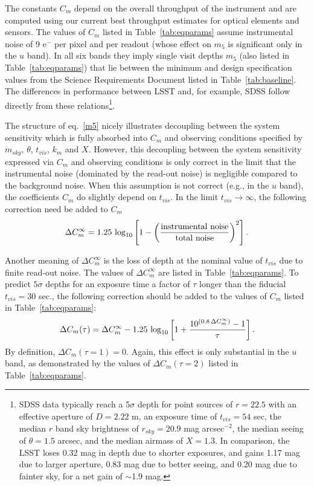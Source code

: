 The constants $C_m$ depend on the overall throughput of the instrument
and are computed using our current best throughput estimates for
optical elements and sensors. The values of $C_m$ listed in Table~\ref{tab:eqparams} 
assume instrumental noise of 9 e$^-$ per pixel and per readout (whose effect on $m_5$
is significant only in the $u$ band). In all six bands they imply single visit depths $m_5$ 
(also listed in Table~\ref{tab:eqparams}) that lie between the minimum and design
specification values from the Science Requirements
Document listed in Table~\ref{tab:baseline}.
The differences in performance between LSST and, for example, SDSS
follow directly from these relations\footnote{SDSS data
typically reach a 5$\sigma$ depth for point sources of $r=22.5$
with an effective aperture of $D=2.22$ m, an exposure time of $t_{vis}=54$
sec, the median $r$ band sky brightness of $r_{sky}=20.9$ mag arcsec$^{-2}$,
the median seeing of $\theta=1.5$ arcsec, and the median airmass of $X=1.3$.
In comparison, the LSST loses 0.32 mag in depth due to shorter exposures,
and gains 1.17 mag due to larger aperture, 0.83 mag due to better
seeing, and 0.20 mag due to fainter sky, for a net gain of $\sim$1.9 mag.}.

The structure of eq.~\ref{m5} nicely illustrates decoupling between the system
sensitivity which is fully absorbed into $C_m$ and observing conditions
specified by $m_{sky}$, $\theta$, $t_{vis}$, $k_m$
and $X$. However, this decoupling between the system sensitivity 
expressed via $C_m$ and observing conditions is only correct in the limit that the instrumental noise 
(dominated by the read-out noise) is negligible compared to the background noise. When this assumption 
is not correct (e.g., in the $u$ band), the coefficients $C_m$ do slightly depend on $t_{vis}$. In the limit 
$t_{vis} \rightarrow \infty$, the following correction need be added to $C_m$
\begin{equation}
\Delta C^\infty_m = 1.25 \,\log_{10}\left[1 - \left(\mathrm{instrumental \,\, noise} \over \mathrm{total \,\, noise}    \right)^2\right].
\end{equation}

Another meaning of $\Delta C^\infty_m$ is the loss of depth at the nominal value of $t_{vis}$ due to finite 
read-out noise. The values of  $\Delta C^\infty_m$ are listed in Table~\ref{tab:eqparams}. To predict 
$5\sigma$ depths for an exposure time a factor of $\tau$ longer than the fiducial $t_{vis} = 30$ sec., the
following correction should be added to the values of $C_m$ listed in Table~\ref{tab:eqparams}:
\begin{equation}
\label{eq:DCm}
 \Delta C_m(\tau) = \Delta C^\infty_m - 1.25\,\log_{10}\left[1 + {10^{(0.8 \, \Delta C^\infty_m)} - 1 \over \tau}  \right].
\end{equation}
By definition, $\Delta C_m(\tau=1)=0$. Again, this effect is only substantial in the $u$
band, as demonstrated by the values of $\Delta C_m(\tau = 2)$ listed in Table~\ref{tab:eqparams}.

